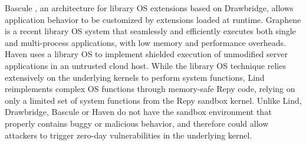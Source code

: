 
Bascule \cite{Bascule}, an architecture for library OS extensions
based on Drawbridge, allows application behavior to be customized by
extensions loaded at runtime.
Graphene \cite{Graphene-14} is a recent library OS system that
seamlessly and efficiently executes both single and
multi-process applications, with low memory and performance overheads.
Haven \cite{Haven} uses a library OS to implement
shielded execution of unmodified server applications
in an untrusted cloud host.
While the library OS technique relies extensively on
the underlying kernels to perform system functions, 
Lind reimplements complex OS functions through memory-safe Repy 
code, relying on only a limited set of system functions from the Repy 
sandbox kernel. 
Unlike Lind, Drawbridge, Bascule 
or Haven do not have the sandbox environment that properly contains 
buggy or malicious behavior, and therefore could allow attackers 
to trigger zero-day vulnerabilities in the underlying kernel. 


